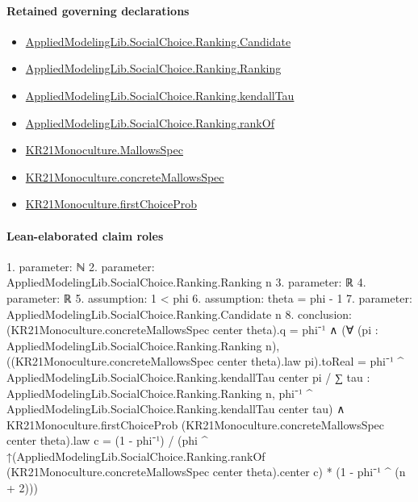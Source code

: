 \documentclass[10pt]{article}
\begin{document}
\paragraph{Retained governing declarations}
\begin{itemize}\raggedright
\item \hyperlink{library-prerequisite-8c0e6c25845ae78a}{Applied\allowbreak{}Modeling\allowbreak{}Lib.\allowbreak{}Social\allowbreak{}Choice.\allowbreak{}Ranking.\allowbreak{}Candidate}
\item \hyperlink{library-prerequisite-5cde54446d1ae021}{Applied\allowbreak{}Modeling\allowbreak{}Lib.\allowbreak{}Social\allowbreak{}Choice.\allowbreak{}Ranking.\allowbreak{}Ranking}
\item \hyperlink{governing-declaration-127efd44d176e2ba}{Applied\allowbreak{}Modeling\allowbreak{}Lib.\allowbreak{}Social\allowbreak{}Choice.\allowbreak{}Ranking.\allowbreak{}kendall\allowbreak{}Tau}
\item \hyperlink{governing-declaration-ef804e95c0f14f7c}{Applied\allowbreak{}Modeling\allowbreak{}Lib.\allowbreak{}Social\allowbreak{}Choice.\allowbreak{}Ranking.\allowbreak{}rank\allowbreak{}Of}
\item \hyperlink{governing-declaration-b2e6ec0602659b07}{KR21\allowbreak{}Monoculture.\allowbreak{}Mallows\allowbreak{}Spec}
\item \hyperlink{governing-declaration-0e399c7dd166853c}{KR21\allowbreak{}Monoculture.\allowbreak{}concrete\allowbreak{}Mallows\allowbreak{}Spec}
\item \hyperlink{governing-declaration-93eb0433da315974}{KR21\allowbreak{}Monoculture.\allowbreak{}first\allowbreak{}Choice\allowbreak{}Prob}
\end{itemize}
\paragraph{Lean-elaborated claim roles}\begin{ReviewVerbatim}
1. parameter: ℕ
2. parameter: AppliedModelingLib.SocialChoice.Ranking.Ranking n
3. parameter: ℝ
4. parameter: ℝ
5. assumption: 1 < phi
6. assumption: theta = phi - 1
7. parameter: AppliedModelingLib.SocialChoice.Ranking.Candidate n
8. conclusion: (KR21Monoculture.concreteMallowsSpec center theta).q = phi⁻¹ ∧
  (∀ (pi : AppliedModelingLib.SocialChoice.Ranking.Ranking n),
      ((KR21Monoculture.concreteMallowsSpec center theta).law pi).toReal =
        phi⁻¹ ^ AppliedModelingLib.SocialChoice.Ranking.kendallTau center pi /
          ∑ tau : AppliedModelingLib.SocialChoice.Ranking.Ranking n,
            phi⁻¹ ^ AppliedModelingLib.SocialChoice.Ranking.kendallTau center tau) ∧
    KR21Monoculture.firstChoiceProb (KR21Monoculture.concreteMallowsSpec center theta).law c =
      (1 - phi⁻¹) /
        (phi ^
            ↑(AppliedModelingLib.SocialChoice.Ranking.rankOf (KR21Monoculture.concreteMallowsSpec center theta).center
                c) *
          (1 - phi⁻¹ ^ (n + 2)))
\end{ReviewVerbatim}
\end{document}
